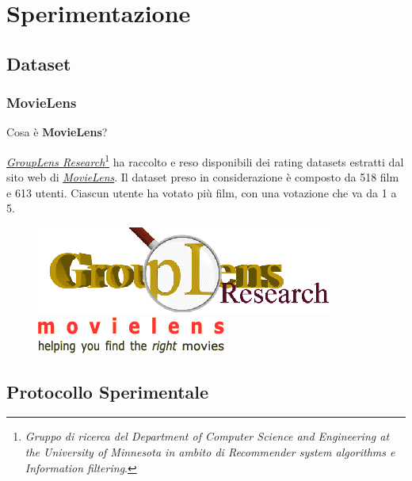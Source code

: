 \documentclass{beamer}
\begin{document}

\section{Sperimentazione}
\subsection{Dataset}
\begin{frame}
\frametitle{MovieLens}
Cosa è \textbf{MovieLens}? \\ \vspace{0.5cm}

\href{http://www.grouplens.org/}{\emph{GroupLens Research}}\footnote{\tiny \emph{Gruppo di ricerca del Department of Computer Science and Engineering at the University of Minnesota in ambito di Recommender system algorithms e Information filtering}.} ha raccolto e reso disponibili dei rating datasets estratti dal sito web di \href{http://movielens.umn.edu}{\emph{MovieLens}}.
Il dataset preso in considerazione è composto da 518 film e 613 utenti. Ciascun utente ha votato più film, con una votazione che va da 1 a 5. 
\begin{figure}
	\includegraphics[width=.3\textwidth]{figure/gl-logo} ~~~~ 
	\includegraphics[width=.3\textwidth]{figure/movielens-helping}
\end{figure}
\end{frame}

\subsection{Protocollo Sperimentale}

\end{document}
